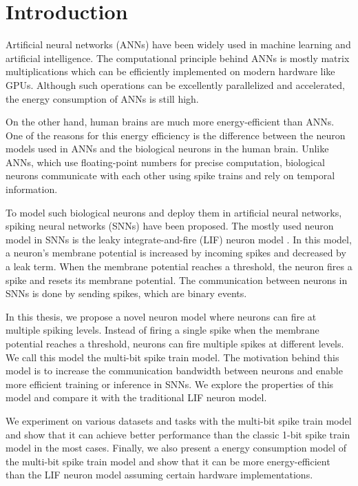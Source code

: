\chapter{Introduction}
\label{chap:introduction}

Artificial neural networks (ANNs) have been widely used in machine learning and artificial intelligence. The computational principle behind ANNs is mostly matrix multiplications which can be efficiently implemented on modern hardware like GPUs. Although such operations can be excellently parallelized and accelerated, the energy consumption of ANNs is still high. 

On the other hand, human brains are much more energy-efficient than ANNs. One of the reasons for this energy efficiency is the difference between the neuron models used in ANNs and the biological neurons in the human brain. Unlike ANNs, which use floating-point numbers for precise computation, biological neurons communicate with each other using spike trains and rely on temporal information. 

To model such biological neurons and deploy them in artificial neural networks, spiking neural networks (SNNs) have been proposed. The mostly used neuron model in SNNs is the leaky integrate-and-fire (LIF) neuron model \cite{lapicque1907louis}. In this model, a neuron's membrane potential is increased by incoming spikes and decreased by a leak term. When the membrane potential reaches a threshold, the neuron fires a spike and resets its membrane potential. The communication between neurons in SNNs is done by sending spikes, which are binary events.

In this thesis, we propose a novel neuron model where neurons can fire at multiple spiking levels. Instead of firing a single spike when the membrane potential reaches a threshold, neurons can fire multiple spikes at different levels. We call this model the multi-bit spike train model. The motivation behind this model is to increase the communication bandwidth between neurons and enable more efficient training or inference in SNNs. We explore the properties of this model and compare it with the traditional LIF neuron model.

We experiment on various datasets and tasks with the multi-bit spike train model and show that it can achieve better performance than the classic 1-bit spike train model in the most cases. Finally, we also present a energy consumption model of the multi-bit spike train model and show that it can be more energy-efficient than the LIF neuron model assuming certain hardware implementations.
